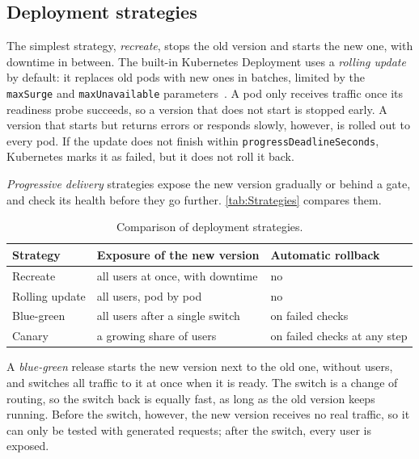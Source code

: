 \subsection{Deployment strategies}
\label{sec:DeploymentStrategies}
The simplest strategy, \emph{recreate}, stops the old version and starts the new one, with downtime in between. The built-in Kubernetes Deployment uses a \emph{rolling update} by default: it replaces old pods with new ones in batches, limited by the \texttt{maxSurge} and \texttt{maxUnavailable} parameters~\cite{K8sDeployment}. A pod only receives traffic once its readiness probe succeeds, so a version that does not start is stopped early. A version that starts but returns errors or responds slowly, however, is rolled out to every pod. If the update does not finish within \texttt{progressDeadlineSeconds}, Kubernetes marks it as failed, but it does not roll it back.

\emph{Progressive delivery} strategies expose the new version gradually or behind a gate, and check its health before they go further. \autoref{tab:Strategies} compares them.

\begin{table}[ht]
	\footnotesize
	\centering
	\begin{tabular}{ l l l }
		\toprule
		Strategy & Exposure of the new version & Automatic rollback \\
		\midrule
		Recreate & all users at once, with downtime & no \\
		Rolling update & all users, pod by pod & no \\
		Blue-green & all users after a single switch & on failed checks \\
		Canary & a growing share of users & on failed checks at any step \\
		\bottomrule
	\end{tabular}
	\caption{Comparison of deployment strategies.}
	\label{tab:Strategies}
\end{table}

A \emph{blue-green} release starts the new version next to the old one, without users, and switches all traffic to it at once when it is ready. The switch is a change of routing, so the switch back is equally fast, as long as the old version keeps running. Before the switch, however, the new version receives no real traffic, so it can only be tested with generated requests; after the switch, every user is exposed.

